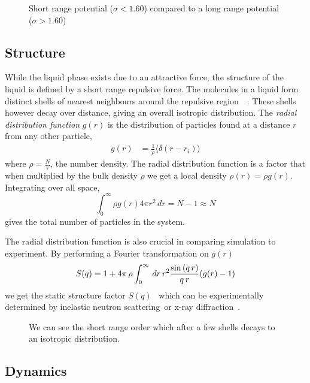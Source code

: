 \begin{figure}
    \label{fig:potentials}
    \caption{Short range potential ($\sigma < 1.60$) compared to a long range potential ($\sigma > 1.60$)}
\end{figure}

\subsection{Structure}
While the liquid phase exists due to an attractive force, the structure of the liquid is defined by a short range repulsive force. The molecules in a liquid form distinct shells of nearest neighbours around the repulsive region~~\cite{barrat:03}. These shells however decay over distance, giving an overall isotropic distribution. The \emph{radial distribution function} $g(r)$ is the distribution of particles found at a distance $r$ from any other particle,
\begin{align}
    g(r) &= \frac{1}{\rho} \langle \delta(r - r_i) \rangle
\end{align}
where $\rho = \frac{N}{V}$, the number density. The radial distribution function is a factor that when multiplied by the bulk density $\rho$ we get a local density $\rho(r) = \rho g(r)$. Integrating over all space,
\begin{equation}
    \int_0^\infty \rho g(r) 4 \pi r^2\,dr = N-1 \approx N
\end{equation}
gives the total number of particles in the system.

The radial distribution function is also crucial in comparing simulation to experiment. By performing a Fourier transformation on $g(r)$
\begin{equation}
    S(q) = 1 + 4\pi\,\rho \int^\infty_0\,d r\,r^2 \frac{\sin{(q\,r)}}{q\,r} (g(r)-1)
\end{equation}
we get the static structure factor $S(q)$~\cite{allen:87,hansen:86} which can be experimentally determined by inelastic neutron scattering~\tocite or x-ray diffraction~\tocite.

\begin{figure}
    \label{fig:radial distribution}
    \caption{We can see the short range order which after a few shells decays to an isotropic distribution.}
\end{figure}

\subsection{Dynamics}

